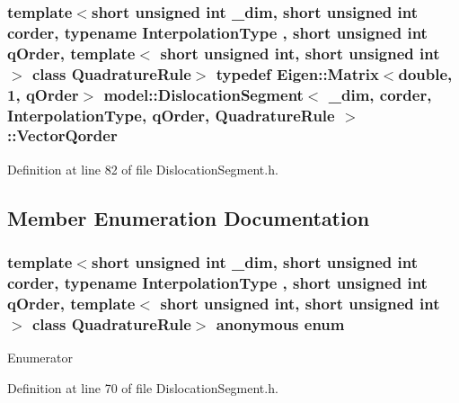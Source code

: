 \subsubsection[{Vector\+Qorder}]{\setlength{\rightskip}{0pt plus 5cm}template$<$short unsigned int \+\_\+dim, short unsigned int corder, typename Interpolation\+Type , short unsigned int q\+Order, template$<$ short unsigned int, short unsigned int $>$ class Quadrature\+Rule$>$ typedef Eigen\+::\+Matrix$<$double, 1, q\+Order$>$ {\bf model\+::\+Dislocation\+Segment}$<$ \+\_\+dim, corder, Interpolation\+Type, q\+Order, Quadrature\+Rule $>$\+::{\bf Vector\+Qorder}}\label{classmodel_1_1_dislocation_segment_a281818c12d5407c323c68433ed958587}


Definition at line 82 of file Dislocation\+Segment.\+h.



\subsection{Member Enumeration Documentation}
\hypertarget{classmodel_1_1_dislocation_segment_a10a92a3e7fa3a34303d85bd00da0de02}{}\subsubsection[{anonymous enum}]{\setlength{\rightskip}{0pt plus 5cm}template$<$short unsigned int \+\_\+dim, short unsigned int corder, typename Interpolation\+Type , short unsigned int q\+Order, template$<$ short unsigned int, short unsigned int $>$ class Quadrature\+Rule$>$ anonymous enum}\label{classmodel_1_1_dislocation_segment_a10a92a3e7fa3a34303d85bd00da0de02}
\begin{Desc}
\item[Enumerator]\par
\begin{description}
\item[{\em 
\hypertarget{classmodel_1_1_dislocation_segment_a10a92a3e7fa3a34303d85bd00da0de02a026f372e58773b98ecc0b1e1db99a323}{}dim\label{classmodel_1_1_dislocation_segment_a10a92a3e7fa3a34303d85bd00da0de02a026f372e58773b98ecc0b1e1db99a323}
}]\end{description}
\end{Desc}


Definition at line 70 of file Dislocation\+Segment.\+h.



